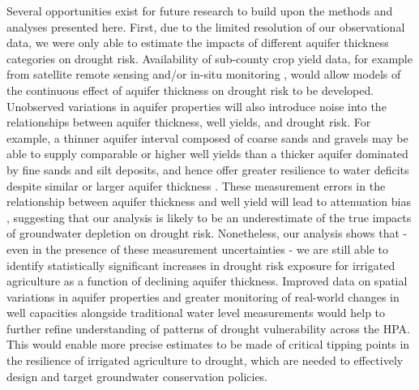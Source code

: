 \documentclass[
]{article}
\begin{document}
Several opportunities exist for future research to build upon the methods and analyses presented here. First, due to the limited resolution of our observational data, we were only able to estimate the impacts of different aquifer thickness categories on drought risk. Availability of sub-county crop yield data, for example from satellite remote sensing and/or in-situ monitoring \citep{edreira2020combining, deines2021million}, would allow models of the continuous effect of aquifer thickness on drought risk to be developed. Unobserved variations in aquifer properties will also introduce noise into the relationships between aquifer thickness, well yields, and drought risk. For example, a thinner aquifer interval composed of coarse sands and gravels may be able to supply comparable or higher well yields than a thicker aquifer dominated by fine sands and silt deposits, and hence offer greater resilience to water deficits despite similar or larger aquifer thickness \citep{butler2013interpretation, korus2020depletion}. These measurement errors in the relationship between aquifer thickness and well yield will lead to attenuation bias \citep{bound1991extent, hyslop2001bias}, suggesting that our analysis is likely to be an underestimate of the true impacts of groundwater depletion on drought risk. Nonetheless, our analysis shows that - even in the presence of these measurement uncertainties - we are still able to identify statistically significant increases in drought risk exposure for irrigated agriculture as a function of declining aquifer thickness. Improved data on spatial variations in aquifer properties and greater monitoring of real-world changes in well capacities alongside traditional water level measurements would help to further refine understanding of patterns of drought vulnerability across the HPA. This would enable more precise estimates to be made of critical tipping points in the resilience of irrigated agriculture to drought, which are needed to effectively design and target groundwater conservation policies.
\end{document}
